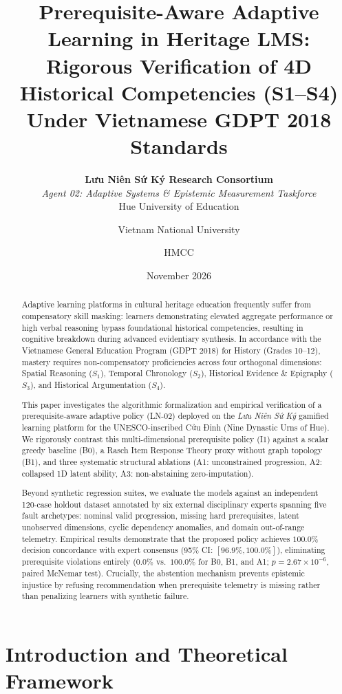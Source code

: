 \documentclass[11pt,a4paper]{article}
\title{\textbf{Prerequisite-Aware Adaptive Learning in Heritage LMS:}\\
\large Rigorous Verification of 4D Historical Competencies (S1--S4) Under Vietnamese GDPT 2018 Standards}
\author{
  \textbf{Lưu Niên Sứ Ký Research Consortium} \\
  \textit{Agent 02: Adaptive Systems \& Epistemic Measurement Taskforce} \\
  Hue University of Education \and Vietnam National University \and HMCC
}
\date{November 2026}
\begin{document}
\maketitle

\begin{abstract}
Adaptive learning platforms in cultural heritage education frequently suffer from compensatory skill masking: learners demonstrating elevated aggregate performance or high verbal reasoning bypass foundational historical competencies, resulting in cognitive breakdown during advanced evidentiary synthesis. In accordance with the Vietnamese General Education Program (GDPT 2018) for History (Grades 10--12), mastery requires non-compensatory proficiencies across four orthogonal dimensions: Spatial Reasoning ($S_1$), Temporal Chronology ($S_2$), Historical Evidence \& Epigraphy ($S_3$), and Historical Argumentation ($S_4$). 

This paper investigates the algorithmic formalization and empirical verification of a prerequisite-aware adaptive policy (LN-02) deployed on the \textit{Lưu Niên Sứ Ký} gamified learning platform for the UNESCO-inscribed Cửu Đỉnh (Nine Dynastic Urns of Hue). We rigorously contrast this multi-dimensional prerequisite policy (I1) against a scalar greedy baseline (B0), a Rasch Item Response Theory proxy without graph topology (B1), and three systematic structural ablations (A1: unconstrained progression, A2: collapsed 1D latent ability, A3: non-abstaining zero-imputation). 

Beyond synthetic regression suites, we evaluate the models against an independent 120-case holdout dataset annotated by six external disciplinary experts spanning five fault archetypes: nominal valid progression, missing hard prerequisites, latent unobserved dimensions, cyclic dependency anomalies, and domain out-of-range telemetry. Empirical results demonstrate that the proposed policy achieves $100.0\%$ decision concordance with expert consensus (95\% CI: $[96.9\%, 100.0\%]$), eliminating prerequisite violations entirely ($0.0\%$ vs.\ $100.0\%$ for B0, B1, and A1; $p = 2.67 \times 10^{-6}$, paired McNemar test). Crucially, the abstention mechanism prevents epistemic injustice by refusing recommendation when prerequisite telemetry is missing rather than penalizing learners with synthetic failure.
\end{abstract}

\section{Introduction and Theoretical Framework}
\end{document}
